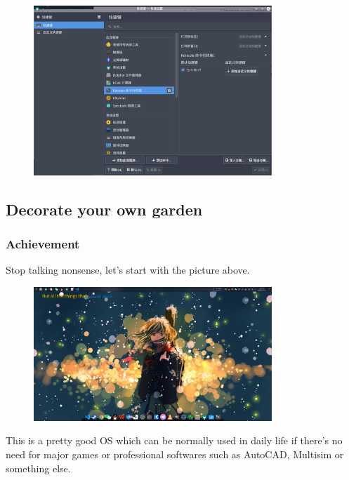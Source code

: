 \documentclass[12pt]{ctexart}
\begin{document}
\begin{figure}[H]
    \centering
    \includegraphics[width=0.8\textwidth,keepaspectratio]{assets/Linux/3.1 Seek common ground while reserving differences/12.png}
\end{figure}

\newpage
\subsection{\textbf{Decorate your own garden}}

\subsubsection{\textbf{Achievement}}

Stop talking nonsense, let's start with the picture
above.

\begin{figure}[H]
    \centering
    \includegraphics[width=0.8\textwidth,keepaspectratio]{assets/Linux/3.2 Decorate your own garden/1.png}
\end{figure}

This is a pretty good OS which can be normally used in daily life if
there's no need for major games or professional
softwares such as AutoCAD, Multisim or something else.
\end{document}
